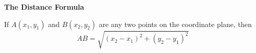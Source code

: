 \begin{center}
\textbf{The Distance Formula 
}
\end{center}

\vspce 

If $A(x_1, y_1)$ and $B(x_2, y_2)$ are any two points on the coordinate plane, then
\[
AB = \sqrt{(x_2-x_1)^2 + (y_2-y_1)^2}
\] 

